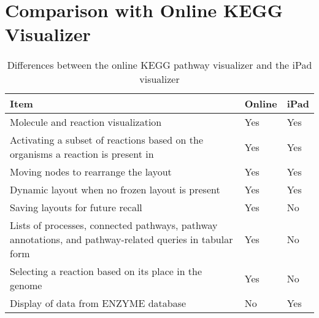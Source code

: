 \section{Comparison with Online KEGG Visualizer}
\label{sect:kegg_comparison}

\begin{table}[ht!]
\centering
\begin{tabular}{ | p{3in} | l | l | }
    \hline
    Item                & Online    & iPad \\ \hline

    Molecule and reaction visualization
                        & Yes       & Yes \\ \hline

    Activating a subset of reactions based on the organisms a reaction is
    present in
                        & Yes       & Yes \\ \hline

    Moving nodes to rearrange the layout
                        & Yes       & Yes \\ \hline

    Dynamic layout when no frozen layout is present
                        & Yes       & Yes \\ \hline

    Saving layouts for future recall
                        & Yes       & No \\ \hline

    Lists of processes, connected pathways, pathway annotations, and
    pathway-related queries in tabular form
                        & Yes       & No \\ \hline

    Selecting a reaction based on its place in the genome
                        & Yes       & No \\ \hline

    Display of data from ENZYME database
                        & No        & Yes \\ \hline
\end{tabular}
    \label{fig:kegg_comparison_table}
    \caption{Differences between the online KEGG pathway visualizer and the iPad
    visualizer}
\end{table}
